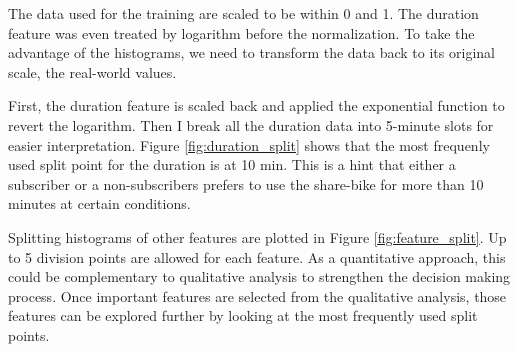 \documentclass[a4paper]{article}
\begin{document}
			The data used for the training are scaled to be within 0 and 1. The duration feature was even treated by logarithm before the normalization. To take the advantage of the histograms, we need to transform the data back to its original scale, the real-world values. 
			
			First, the duration feature is scaled back and applied the exponential function to revert the logarithm. Then I break all the duration data into 5-minute slots for easier interpretation. Figure \ref{fig:duration_split} shows that the most frequenly used split point for the duration is at 10 min. This is a hint that either a subscriber or a non-subscribers prefers to use the share-bike for more than 10 minutes at certain conditions.
			
			Splitting histograms of other features are plotted in Figure \ref{fig:feature_split}. Up to 5 division points are allowed for each feature. As a quantitative approach, this could be complementary to qualitative analysis to strengthen the decision making process. Once important features are selected from the qualitative analysis, those features can be explored further by looking at the most frequently used split points.
			
\end{document}
